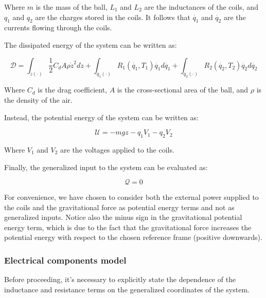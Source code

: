 Where $m$ is the mass of the ball, $L_1$ and $L_2$ are the inductances of the coils, and $q_1$ and $q_2$ are the charges stored in the coils.
It follows that $\dot{q_1}$ and $\dot{q_2}$ are the currents flowing through the coils.

The dissipated energy of the system can be written as:

\begin{equation}
    \mathcal{D} = \int_{\dot{z}(\cdot)} \frac{1}{2} C_d A \rho \dot{z}^2 d\dot{z} + \int_{\dot{q_1}(\cdot)} R_1(\dot{q_1}, T_1) \dot{q_1} d\dot{q_1} + \int_{\dot{q_2}(\cdot)} R_2(\dot{q_2}, T_2) \dot{q_2} d\dot{q_2}
    \label{eq:dissipated_energy}
\end{equation}

Where $C_d$ is the drag coefficient, $A$ is the cross-sectional area of the ball, and $\rho$ is the density of the air.

Instead, the potential energy of the system can be written as:

\begin{equation}
    \mathcal{U} = -m g z - q_1 V_1 - q_2 V_2
    \label{eq:potential_energy}
\end{equation}

Where $V_1$ and $V_2$ are the voltages applied to the coils.

Finally, the generalized input to the system can be evaluated as:

\begin{equation}
    \mathcal{Q} = 0
    \label{eq:generalized_input}
\end{equation}

For convenience, we have chosen to consider both the external power supplied to the coils and the gravitational force as potential energy terms and not as generalized inputs.
Notice also the minus sign in the gravitational potential energy term, which is due to the fact that the gravitational force increases the potential energy with respect to the chosen reference frame (positive downwards).

\subsubsection{Electrical components model}
\label{subsubsec:electrical_components_model}

Before proceeding, it's necessary to explicitly state the dependence of the inductance and resistance terms on the generalized coordinates of the system.

